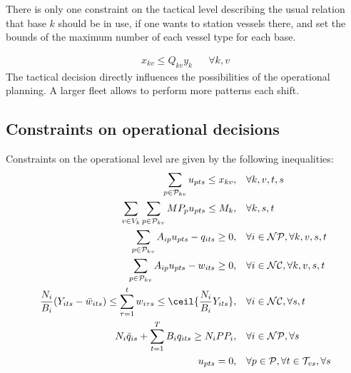 There is only one constraint on the tactical level describing the usual relation that base $k$ should be in use, if one wants to station vessels there, and set the bounds of the maximum number of each vessel type for each base.

\begin{align}
\label{eq:const1:maxVkfromK}
  x_{kv} \leq Q_{kv}y_{k}  	&	&	\forall k, v
\end{align}
%
 The tactical decision directly influences the possibilities of the operational planning. A larger fleet allows to perform more patterns each shift.

\subsection{Constraints on operational decisions}
Constraints on the operational level are given by the following inequalities:
\begin{align}
\label{eq:const1}
  \sum\limits_{p\in \mathcal{P}_{kv}} u_{pts}\le x_{kv}, 			&\quad		\forall k,v,t,s\\
  \label{eq:const4}
  \sum\limits_{v\in V_k}\sum\limits_{p\in \mathcal{P}_{kv}} MP_{p}u_{pts} \leq M_{k},				&\quad	\forall k,s,t\\
  \label{eq:const5}
   \sum\limits_{p\in \mathcal{P}_{kv}} A_{ip}u_{pts} - q_{its}\geq 0,				&\quad	\forall i\in \mathcal{NP}, \forall k,v,s, t\\
   \label{eq:const6}
   \sum\limits_{p\in \mathcal{P}_{kv}} A_{ip}u_{pts} - w_{its}\geq 0,				&\quad	\forall i\in \mathcal{NC}, \forall k,v,s, t\\
\label{eq:const:rw}
  \frac{N_{i}}{B_{i}}(Y_{its}-\bar{w}_{its}) \leq  \sum\limits_{\tau=1}^t  w_{i\tau s}\leq \ceil{\frac{N_{i}}{B_{i}} Y_{its}}, 		 &\quad	\forall i \in\mathcal{NC}, \forall s,t\\
\label{eq:const3}
   N_{i}\bar{q}_{is}+ \sum\limits_{t=1}^T B_{i}q_{its}\ge N_{i}PP_{i}, 		&\quad \forall i \in \mathcal{NP}, \forall s\\
\label{eq:constweather}
   	u_{pts}=0, &\quad \forall p\in \mathcal{P}, \forall t \in \mathcal{T}_{vs}, \forall s
\end{align}
